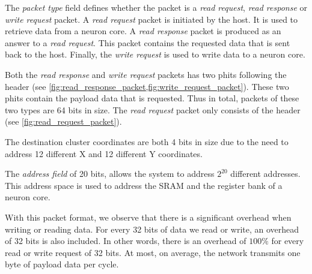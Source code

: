 The \textit{packet type} field defines whether the packet is a \textit{read request}, \textit{read response} or \textit{write request} packet.
A \textit{read request} packet is initiated by the host.
It is used to retrieve data from a neuron core.
A \textit{read response} packet is produced as an answer to a \textit{read request}.
This packet contains the requested data that is sent back to the host.
Finally, the \textit{write request} is used to write data to a neuron core.

Both the \textit{read response} and \textit{write request} packets has two phits following the header (see \cref{fig:read_response_packet,fig:write_request_packet}).
These two phits contain the payload data that is requested.
Thus in total, packets of these two types are 64 bits in size.
The \textit{read request} packet only consists of the header (see \cref{fig:read_request_packet}).

The destination cluster coordinates are both 4 bits in size due to the need to address 12 different X and 12 different Y coordinates.

The \textit{address field} of 20 bits, allows the system to address $2^{20}$ different addresses.
This address space is used to address the SRAM and the register bank of a neuron core.

With this packet format, we observe that there is a significant overhead when writing or reading data.
For every 32 bits of data we read or write, an overhead of 32 bits is also included.
In other words, there is an overhead of $100\%$ for every read or write request of 32 bits.
At most, on average, the network transmits one byte of payload data per cycle.


